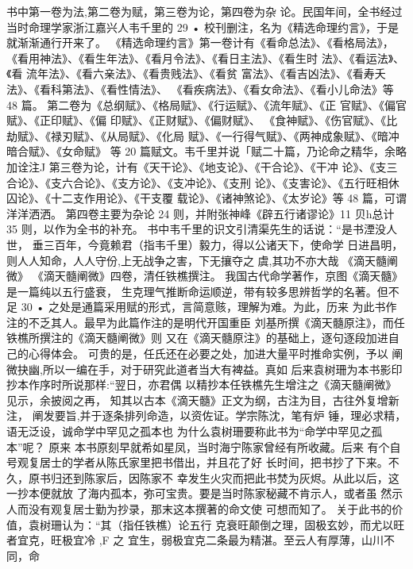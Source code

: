 书中第一卷为法,第二卷为赋，第三卷为论，第四卷为杂
论。民国年间，全书经过当时命理学家浙江嘉兴人韦千里的
29 •
校刊删注，名为《精选命理约言》，于是就渐渐通行开来了。
《精选命理约言》第一卷计有《看命总法》、《看格局法》，
《看用神法》、《看生年法》、《看月令法》、《看日主法》、《看生时
法》、《看运法》、《看 流年法》、《看六亲法》、《看贵贱法》、《看贫
富法》、《看吉凶法》、《看寿夭法》、《看科第法》、《看性情法》、
《看疾病法》、《看女命法》、《看小儿命法》等 48 篇。
第二卷为《总纲赋》、《格局赋》、《行运赋》、《流年赋》、《正
官赋》、《偏官赋》、《正印赋》、《偏 印赋》、《正财赋》、《偏财赋》、
《食神赋》、《伤官赋》、《比劫赋》、《禄刃赋》、《从局赋》、《化局
赋》、《一行得气赋》、《两神成象赋》、《暗冲暗合赋》、《女命赋》
等 20 篇赋文。韦千里并说「赋二十篇，乃论命之精华，余略
加诠注J
第三卷为论，计有《天干论》、《地支论》、《干合论》、《干冲
论》、《支三合论》、《支六合论》、《支方论》、《支冲论》、《支刑
论》、《支害论》、《五行旺相休囚论》、《十二支作用论》、《干支覆
载论》、《诸神煞论》、《太岁论》等 48 篇，可谓洋洋洒洒。
第四卷主要为杂论 24 则，并附张神峰《辟五行诸谬论》11
贝h总计 35 则，以作为全书的补充。
书中韦千里的识文引清渠先生的话说：“是书湮没人世，
垂三百年，今竟赖君（指韦千里）毅力，得以公诸天下，使命学
日进昌明，则人人知命，人人守份,上无战争之害，下无攘夺之
虞,其功不亦大哉
《滴天髓阐微》
《滴天髓阐微》四卷，清任铁樵撰注。
我国古代命学著作，京图《滴天髓》是一篇纯以五行盛衰，
生克理气推断命运顺逆，带有较多思辨哲学的名著。但不足
30 •
之处是通篇采用赋的形式，言简意赅，理解为难。为此，历来
为此书作注的不乏其人。最早为此篇作注的是明代开国重臣
刘基所撰《滴天髓原注》，而任铁樵所撰注的《滴天髓阐微》则
又在《滴天髓原注》的基础上，逐句逐段加进自己的心得体会。
可贵的是，任氏还在必要之处，加进大量平时推命实例，予以
阐微抉幽,所以一编在手，对于研究此道者当大有裨益。真如
后来袁树珊为本书影印抄本作序时所说那样:“翌日，亦君偶
以精抄本任铁樵先生增注之《滴天髓阐微》见示，余披阅之再，
知其以古本《滴天髓》正文为纲，古注为目，古往外复增新注，
阐发要旨,并于逐条排列命造，以资佐证。学宗陈沈，笔有炉
锤，理必求精，语无泛设，诚命学中罕见之孤本也
为什么袁树珊要称此书为“命学中罕见之孤本”呢？ 原来
本书原刻早就希如星凤，当时海宁陈家曾经有所收藏。后来
有个自号观复居士的学者从陈氏家里把书借出，并且花了好
长时间，把书抄了下来。不久，原书归还到陈家后，因陈家不
幸发生火灾而把此书焚为灰烬。从此以后，这一抄本便就放
了海内孤本，弥可宝贵。要是当时陈家秘藏不肯示人，或者虽
然示人而没有观复居士勤为抄录，那末这本撰著的命文使
可想而知了。
关于此书的价值，袁树珊认为：“其（指任铁樵）论五行
克衰旺颠倒之理，固极玄妙，而尤以旺者宜克，旺极宜冷 ,F 之
宜生，弱极宜克二条最为精湛。至云人有厚薄，山川不同，命
